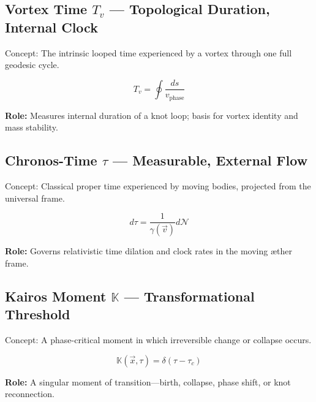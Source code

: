 \subsection*{Vortex Time $T_v$ — Topological Duration, Internal Clock}
Concept: The intrinsic looped time experienced by a vortex through one full geodesic cycle.


\[
T_v = \oint \frac{ds}{v_{\text{phase}}}
\]

\textbf{Role:} Measures internal duration of a knot loop; basis for vortex identity and mass stability.

\subsection*{Chronos-Time $\tau$ — Measurable, External Flow}
Concept: Classical proper time experienced by moving bodies, projected from the universal frame.


\[
d\tau = \frac{1}{\gamma(\vec{v})} d\mathcal{N}
\]

\textbf{Role:} Governs relativistic time dilation and clock rates in the moving æther frame.

\subsection*{Kairos Moment $\mathbb{K}$ — Transformational Threshold}
Concept: A phase-critical moment in which irreversible change or collapse occurs.


\[
\mathbb{K}(\vec{x}, \tau) = \delta(\tau - \tau_c)
\]

\textbf{Role:} A singular moment of transition—birth, collapse, phase shift, or knot reconnection.
